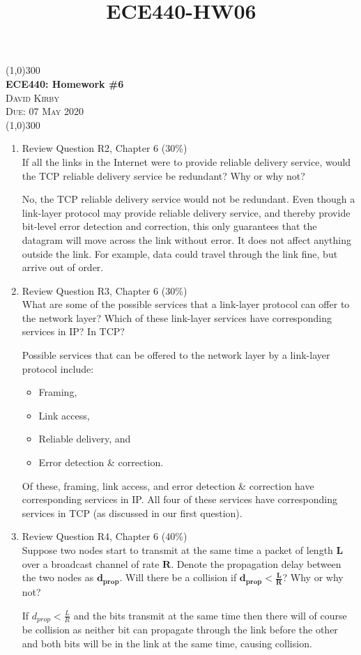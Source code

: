 \documentclass[12pt]{article}
\title{ECE440-HW06}
\begin{document}
 	\begin{center}
     \line(1,0){300}\\[0.25cm]
 	\Large{\bfseries ECE440: Homework \#6}\\
 	\textsc{\large David Kirby}\\
 	\textsc{\large Due: 07 May 2020}\\
 	\line(1,0){300}\\[0.75cm]
 	\end{center}

\begin{enumerate}
\bfseries \item Review Question R2, Chapter 6 (30\%)\\[1em]
If all the links in the Internet were to provide reliable delivery service, would the TCP reliable delivery service be redundant? Why or why not?\par
\mdseries No, the TCP reliable delivery service would not be redundant. Even though a link-layer protocol may provide reliable delivery service, and thereby provide bit-level error detection and correction, this only guarantees that the datagram will move across the link without error. It does not affect anything outside the link. For example, data could travel through the link fine, but arrive out of order.
\bfseries \item Review Question R3, Chapter 6 (30\%)\\[1em]
What are some of the possible services that a link-layer protocol can offer to the network layer? Which of these link-layer services have corresponding services in IP? In TCP?\par
\mdseries Possible services that can be offered to the network layer by a link-layer protocol include:
\begin{itemize}
    \item Framing,
    \item Link access,
    \item Reliable delivery, and
    \item Error detection \& correction.
\end{itemize}
Of these, framing, link access, and error detection \& correction have corresponding services in IP. All four of these services have corresponding services in TCP (as discussed in our first question).
\bfseries \item Review Question R4, Chapter 6 (40\%)\\[1em]
Suppose two nodes start to transmit at the same time a packet of length $\bm{L}$ over a broadcast channel of rate $\bm{R}$. Denote the propagation delay between the two nodes as $\bm{d_{prop}}$. Will there be a collision if $\bm{d_{prop} < \frac{L}{R}}$? Why or why not?\par
\mdseries If $d_{prop} < \frac{L}{R}$ and the bits transmit at the same time then there will of course be collision as neither bit can propagate through the link before the other and both bits will be in the link at the same time, causing collision.
\end{enumerate}
\end{document}
